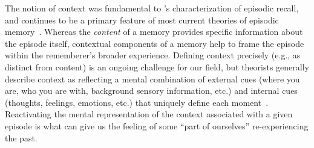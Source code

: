 \documentclass{article}
\begin{document}
The notion of context was fundamental to \citeauthor{Tulv83}'s characterization of episodic recall, and continues to be a primary feature of most current theories of episodic memory~\citep[e.g., for review see][]{Kaha12}.  Whereas the \textit{content} of a memory provides specific information about the episode itself, contextual components of a memory help to frame the episode within the rememberer's broader experience.  Defining context precisely (e.g., as distinct from content) is an ongoing challenge for our field, but theorists generally describe context as reflecting a mental combination of external cues (where you are, who you are with, background sensory information, etc.) and internal cues (thoughts, feelings, emotions, etc.) that uniquely define each moment~\citep[e.g., see review by][]{MannEtal15}.  Reactivating the mental representation of the context associated with a given episode is what can give us the feeling of some ``part of ourselves'' re-experiencing the past.
\end{document}
